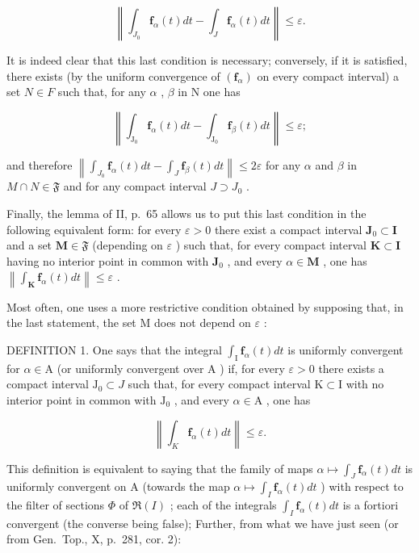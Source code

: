 \[
\left\| \int_ {J _ {0}} \mathbf {f} _ {\alpha} (t) d t - \int_ {J} \mathbf {f} _ {\alpha} (t) d t \right\| \leqslant \varepsilon .\tag{5}
\]

It is indeed clear that this last condition is necessary; conversely, if it is satisfied, there exists (by the uniform convergence of \((\mathbf{f}_{\alpha})\) on every compact interval) a set \(N \in F\) such that, for any \(\alpha\) , \(\beta\) in N one has

\[
\left\| \int_ {\mathrm{J} _ {0}} \mathbf {f} _ {\alpha} (t) d t - \int_ {\mathrm{J} _ {0}} \mathbf {f} _ {\beta} (t) d t \right\| \leqslant \varepsilon ;\tag{6}
\]

and therefore \(\left\|\int_{J_{0}}\mathbf{f}_{\alpha}(t)dt-\int_{J}\mathbf{f}_{\beta}(t)dt\right\|\leqslant2\varepsilon\) for any \(\alpha\) and \(\beta\) in \(M\cap N\in\mathfrak{F}\) and for any compact interval \(J\supset J_{0}\) .

Finally, the lemma of II, p.~65 allows us to put this last condition in the following equivalent form: for every \(\varepsilon > 0\) there exist a compact interval \(\mathbf{J}_0 \subset \mathbf{I}\) and a set \(\mathbf{M} \in \mathfrak{F}\) (depending on \(\varepsilon\) ) such that, for every compact interval \(\mathbf{K} \subset \mathbf{I}\) having no interior point in common with \(\mathbf{J}_0\) , and every \(\alpha \in \mathbf{M}\) , one has \(\left\| \int_{\mathbf{K}} \mathbf{f}_{\alpha}(t) dt \right\| \leqslant \varepsilon\) .

Most often, one uses a more restrictive condition obtained by supposing that, in the last statement, the set M does not depend on \(\varepsilon\) :

DEFINITION 1. One says that the integral \(\int_{\mathrm{I}} \mathbf{f}_{\alpha}(t) dt\) is uniformly convergent for \(\alpha \in \mathrm{A}\) (or uniformly convergent over \(\mathrm{A}\) ) if, for every \(\varepsilon > 0\) there exists a compact interval \(\mathrm{J}_0 \subset J\) such that, for every compact interval \(\mathrm{K} \subset \mathrm{I}\) with no interior point in common with \(\mathrm{J}_0\) , and every \(\alpha \in \mathrm{A}\) , one has

\[
\left\| \int_ {K} \mathbf {f} _ {\alpha} (t) d t \right\| \leqslant \varepsilon .\tag{7}
\]

This definition is equivalent to saying that the family of maps \(\alpha\mapsto\int_{J}\mathbf{f}_{\alpha}(t)dt\) is uniformly convergent on A (towards the map \(\alpha\mapsto\int_{I}\mathbf{f}_{\alpha}(t)dt\) ) with respect to the filter of sections \(\Phi\) of \(\Re(I)\) ; each of the integrals \(\int_{I}\mathbf{f}_{\alpha}(t)dt\) is a fortiori convergent (the converse being false); Further, from what we have just seen (or from Gen.~Top., X, p.~281, cor. 2):

